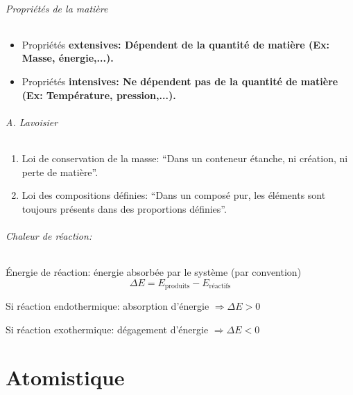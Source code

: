 \documentclass[11pt,a4paper,french]{article}
\renewcommand{\textbf}[1]{\begingroup\bfseries\mathversion{bold}#1\endgroup}
\newcommand\sorb{\mathrm{s}}
\newcommand\dorb{\mathrm{d}}
\begin{document}
\paragraph{Propriétés de la matière}
\begin{itemize}
	\item Propriétés \textbf{extensives}: Dépendent de la quantité de matière (Ex: Masse, énergie,...).
	\item Propriétés \textbf{intensives}: Ne dépendent pas de la quantité de matière (Ex: Température, pression,...).
\end{itemize}

\paragraph{A. Lavoisier}
\begin{enumerate}
	\item Loi de conservation de la masse: ``Dans un conteneur étanche, ni création, ni perte de matière''.
	\item Loi des compositions définies: ``Dans un composé pur, les éléments sont toujours présents dans des proportions définies''.
\end{enumerate}

\paragraph{Chaleur de réaction:}
\'Energie de réaction: énergie absorbée par le système (par convention)
$$\Delta E = E_{\textrm{produits}}-E_{\textrm{réactifs}}$$

Si réaction endothermique: absorption d'énergie $\Rightarrow \Delta E > 0$

Si réaction exothermique: dégagement d'énergie $\Rightarrow  \Delta E < 0$

\part{Atomistique}


\end{document}
